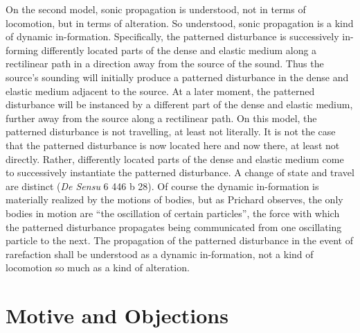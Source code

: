 \documentclass[12pt]{article}
\begin{document}
On the second model, sonic propagation is understood, not in terms of locomotion, but in terms of alteration. So understood, sonic propagation is a kind of dynamic in-formation. Specifically, the patterned disturbance is successively in-forming differently located parts of the dense and elastic medium along a rectilinear path in a direction away from the source of the sound. Thus the source's sounding will initially produce a patterned disturbance in the dense and elastic medium adjacent to the source. At a later moment, the patterned disturbance will be instanced by a different part of the dense and elastic medium, further away from the source along a rectilinear path. On this model, the patterned disturbance is not travelling, at least not literally. It is not the case that the patterned disturbance is now located here and now there, at least not directly. Rather, differently located parts of the dense and elastic medium come to successively instantiate the patterned disturbance. A change of state and travel are distinct (\emph{De Sensu} 6 446 b 28). Of course the dynamic in-formation is materially realized by the motions of bodies, but as Prichard observes, the only bodies in motion are ``the oscillation of certain particles'', the force with which the patterned disturbance propagates being communicated from one oscillating particle to the next. The propagation of the patterned disturbance in the event of rarefaction shall be understood as a dynamic in-formation, not a kind of locomotion so much as a kind of alteration.


\section{Motive and Objections} %
\label{sec:motive_and_objections}
\end{document}
